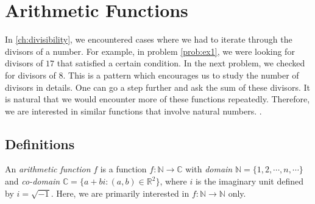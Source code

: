 \chapter{Arithmetic Functions}\label{ch:arithfunc}

In \autoref{ch:divisibility}, we encountered cases where we had to iterate through the divisors of a number. For example, in problem \ref{prob:ex1}, we were looking for divisors of $17$ that satisfied a certain condition. In the next problem, we checked for divisors of $8$. This is a pattern which encourages us to study the number of divisors in details. One can go a step further and ask the sum of these divisors. It is natural that we would encounter more of these functions repeatedly. Therefore, we are interested in similar functions that involve natural numbers. \watermark.
\section{Definitions}

	\begin{definition}
		An \textit{arithmetic function} $f$ is a function $f : \mathbb{N} \to \mathbb{C} $ with \textit{domain} $\mathbb{N} = \{1, 2, \cdots, n, \cdots\}$ and \textit{co-domain} $\mathbb{C} = \{a+bi: (a,b)\in \mathbb{R}^2 \}$, where $i$ is the imaginary unit defined by $i=\sqrt{-1}$. Here, we are primarily interested in $f:\mathbb{N}\to\mathbb{N}$ only.
	\end{definition}

